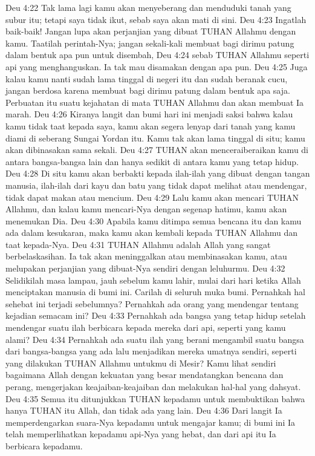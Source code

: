 Deu 4:22  Tak lama lagi kamu akan menyeberang dan menduduki tanah yang subur itu; tetapi saya tidak ikut, sebab saya akan mati di sini.
Deu 4:23  Ingatlah baik-baik! Jangan lupa akan perjanjian yang dibuat TUHAN Allahmu dengan kamu. Taatilah perintah-Nya; jangan sekali-kali membuat bagi dirimu patung dalam bentuk apa pun untuk disembah,
Deu 4:24  sebab TUHAN Allahmu seperti api yang menghanguskan. Ia tak mau disamakan dengan apa pun.
Deu 4:25  Juga kalau kamu nanti sudah lama tinggal di negeri itu dan sudah beranak cucu, jangan berdosa karena membuat bagi dirimu patung dalam bentuk apa saja. Perbuatan itu suatu kejahatan di mata TUHAN Allahmu dan akan membuat Ia marah.
Deu 4:26  Kiranya langit dan bumi hari ini menjadi saksi bahwa kalau kamu tidak taat kepada saya, kamu akan segera lenyap dari tanah yang kamu diami di seberang Sungai Yordan itu. Kamu tak akan lama tinggal di situ; kamu akan dibinasakan sama sekali.
Deu 4:27  TUHAN akan menceraiberaikan kamu di antara bangsa-bangsa lain dan hanya sedikit di antara kamu yang tetap hidup.
Deu 4:28  Di situ kamu akan berbakti kepada ilah-ilah yang dibuat dengan tangan manusia, ilah-ilah dari kayu dan batu yang tidak dapat melihat atau mendengar, tidak dapat makan atau mencium.
Deu 4:29  Lalu kamu akan mencari TUHAN Allahmu, dan kalau kamu mencari-Nya dengan segenap hatimu, kamu akan menemukan Dia.
Deu 4:30  Apabila kamu ditimpa semua bencana itu dan kamu ada dalam kesukaran, maka kamu akan kembali kepada TUHAN Allahmu dan taat kepada-Nya.
Deu 4:31  TUHAN Allahmu adalah Allah yang sangat berbelaskasihan. Ia tak akan meninggalkan atau membinasakan kamu, atau melupakan perjanjian yang dibuat-Nya sendiri dengan leluhurmu.
Deu 4:32  Selidikilah masa lampau, jauh sebelum kamu lahir, mulai dari hari ketika Allah menciptakan manusia di bumi ini. Carilah di seluruh muka bumi. Pernahkah hal sehebat ini terjadi sebelumnya? Pernahkah ada orang yang mendengar tentang kejadian semacam ini?
Deu 4:33  Pernahkah ada bangsa yang tetap hidup setelah mendengar suatu ilah berbicara kepada mereka dari api, seperti yang kamu alami?
Deu 4:34  Pernahkah ada suatu ilah yang berani mengambil suatu bangsa dari bangsa-bangsa yang ada lalu menjadikan mereka umatnya sendiri, seperti yang dilakukan TUHAN Allahmu untukmu di Mesir? Kamu lihat sendiri bagaimana Allah dengan kekuatan yang besar mendatangkan bencana dan perang, mengerjakan keajaiban-keajaiban dan melakukan hal-hal yang dahsyat.
Deu 4:35  Semua itu ditunjukkan TUHAN kepadamu untuk membuktikan bahwa hanya TUHAN itu Allah, dan tidak ada yang lain.
Deu 4:36  Dari langit Ia memperdengarkan suara-Nya kepadamu untuk mengajar kamu; di bumi ini Ia telah memperlihatkan kepadamu api-Nya yang hebat, dan dari api itu Ia berbicara kepadamu.

